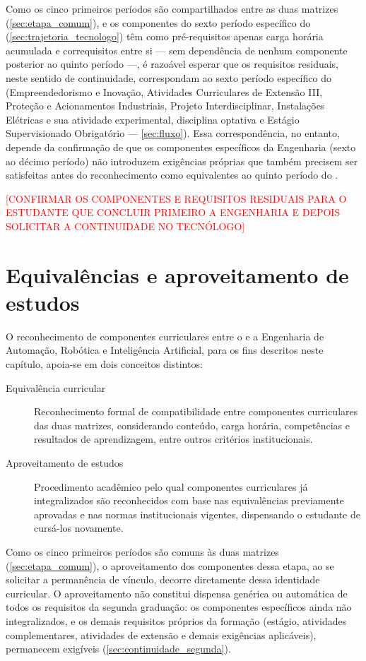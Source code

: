 Como os cinco primeiros períodos são compartilhados entre as duas matrizes (\autoref{sec:etapa_comum}), e os componentes do sexto período específico do \ppccurso (\autoref{sec:trajetoria_tecnologo}) têm como pré-requisitos apenas carga horária acumulada e correquisitos entre si — sem dependência de nenhum componente posterior ao quinto período —, é razoável esperar que os requisitos residuais, neste sentido de continuidade, correspondam ao sexto período específico do \ppccurso (Empreendedorismo e Inovação, Atividades Curriculares de Extensão III, Proteção e Acionamentos Industriais, Projeto Interdisciplinar, Instalações Elétricas e sua atividade experimental, disciplina optativa e Estágio Supervisionado Obrigatório — \autoref{sec:fluxo}). Essa correspondência, no entanto, depende da confirmação de que os componentes específicos da Engenharia (sexto ao décimo período) não introduzem exigências próprias que também precisem ser satisfeitas antes do reconhecimento como equivalentes ao quinto período do \ppccurso.

\textcolor{red}{[CONFIRMAR OS COMPONENTES E REQUISITOS RESIDUAIS PARA O ESTUDANTE QUE CONCLUIR PRIMEIRO A ENGENHARIA E DEPOIS SOLICITAR A CONTINUIDADE NO TECNÓLOGO]}

\section{Equivalências e aproveitamento de estudos}
\label{sec:equivalencias_abi}

O reconhecimento de componentes curriculares entre o \ppccurso e a Engenharia de Automação, Robótica e Inteligência Artificial, para os fins descritos neste capítulo, apoia-se em dois conceitos distintos:

\begin{description}
    \item[Equivalência curricular] Reconhecimento formal de compatibilidade entre componentes curriculares das duas matrizes, considerando conteúdo, carga horária, competências e resultados de aprendizagem, entre outros critérios institucionais.
    \item[Aproveitamento de estudos] Procedimento acadêmico pelo qual componentes curriculares já integralizados são reconhecidos com base nas equivalências previamente aprovadas e nas normas institucionais vigentes, dispensando o estudante de cursá-los novamente.
\end{description}

Como os cinco primeiros períodos são comuns às duas matrizes (\autoref{sec:etapa_comum}), o aproveitamento dos componentes dessa etapa, ao se solicitar a permanência de vínculo, decorre diretamente dessa identidade curricular. O aproveitamento não constitui dispensa genérica ou automática de todos os requisitos da segunda graduação: os componentes específicos ainda não integralizados, e os demais requisitos próprios da formação (estágio, atividades complementares, atividades de extensão e demais exigências aplicáveis), permanecem exigíveis (\autoref{sec:continuidade_segunda}).

